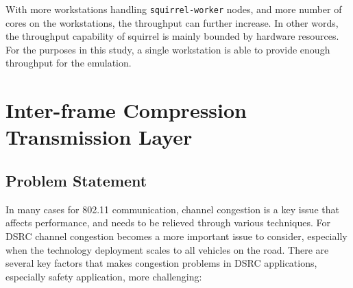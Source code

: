 \documentclass[12pt]{report}
\begin{document}
With more workstations handling \texttt{squirrel-worker} nodes, and more number of cores on the workstations, the throughput can further increase. In other words, the throughput capability of squirrel is mainly bounded by hardware resources. For the purposes in this study, a single workstation is able to provide enough throughput for the emulation.

\chapter{Inter-frame Compression Transmission Layer}

\section{Problem Statement}
\label{sec:problem_congestion}

In many cases for 802.11 communication, channel congestion is a key issue that affects performance, and needs to be relieved through various techniques. For DSRC channel congestion becomes a more important issue to consider, especially when the technology deployment scales to all vehicles on the road. There are several key factors that makes congestion problems in DSRC applications, especially safety application, more challenging:
\end{document}
